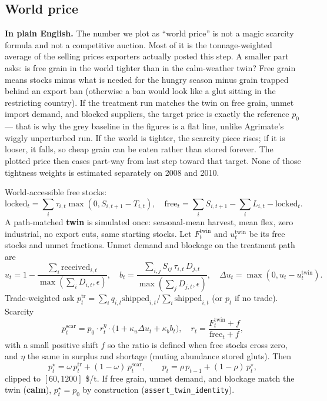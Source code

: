 \subsection{World price}
\label{sec:price}

\textbf{In plain English.} The number we plot as ``world price'' is not a
magic scarcity formula and not a competitive auction. Most of it is the
tonnage-weighted average of the selling prices exporters actually posted
this step. A smaller part asks: is free grain in the world tighter than in
the calm-weather twin? Free grain means stocks minus what is needed for the
hungry season minus grain trapped behind an export ban (otherwise a ban
would look like a glut sitting in the restricting country). If the treatment
run matches the twin on free grain, unmet import demand, and blocked
suppliers, the target price is exactly the reference $p_0$ --- that is why
the grey baseline in the figures is a flat line, unlike Agrimate's wiggly
unperturbed run. If the world is tighter, the scarcity piece rises; if it is
looser, it falls, so cheap grain can be eaten rather than stored forever.
The plotted price then eases part-way from last step toward that target.
None of those tightness weights is estimated separately on 2008 and 2010.

World-accessible free stocks:
\begin{equation}
\label{eq:free}
\mathrm{locked}_t=\sum_i\tau_{i,t}\max(0,S_{i,t+1}-T_{i,t}),
\quad
\mathrm{free}_t=\sum_i S_{i,t+1}-\sum_i L_{i,t}-\mathrm{locked}_t.
\end{equation}
A path-matched \textbf{twin} is simulated once: seasonal-mean harvest, mean
flex, zero industrial, no export cuts, same starting stocks. Let
$F^{\mathrm{twin}}_t$ and $u^{\mathrm{twin}}_t$ be its free stocks and unmet
fractions. Unmet demand and blockage on the treatment path are
\begin{equation}
u_t=1-\frac{\sum_i\mathrm{received}_{i,t}}{\max(\sum_i D_{i,t},\epsilon)},
\quad
b_t=\frac{\sum_{i,j} S_{ij}\,\tau_{i,t}\,D_{j,t}}{\max(\sum_j D_{j,t},\epsilon)},
\quad
\Delta u_t=\max(0,u_t-u^{\mathrm{twin}}_t).
\end{equation}
Trade-weighted ask $p^{\mathrm{tr}}_t=\sum_i q_{i,t}\mathrm{shipped}_{i,t}/\sum_i\mathrm{shipped}_{i,t}$
(or $p_t$ if no trade). Scarcity
\begin{equation}
\label{eq:scar}
p^{\mathrm{scar}}_t=p_0\cdot r_t^{\eta}
\cdot\bigl(1+\kappa_u\Delta u_t+\kappa_b b_t\bigr),
\quad
r_t=\frac{F^{\mathrm{twin}}_t+f}{\mathrm{free}_t+f},
\end{equation}
with a small positive shift $f$ so the ratio is defined when free stocks
cross zero, and $\eta$ the same in surplus and shortage (muting abundance
stored gluts). Then
\begin{equation}
\label{eq:pstar}
p^\star_t=\omega\,p^{\mathrm{tr}}_t+(1-\omega)\,p^{\mathrm{scar}}_t,
\qquad
p_t=\rho\,p_{t-1}+(1-\rho)\,p^\star_t,
\end{equation}
clipped to $[60,1200]$ \$/t. If free grain, unmet demand, and blockage match
the twin (\textbf{calm}), $p^\star_t=p_0$ by construction
(\texttt{assert\_twin\_identity}).

